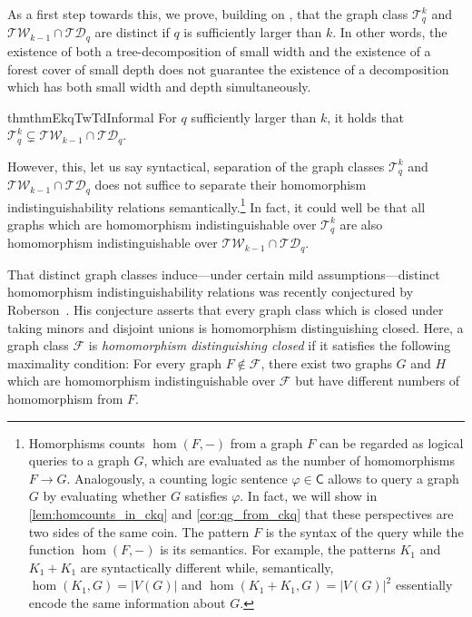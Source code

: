 \documentclass{lmcs}
\theoremstyle{plain}\newtheorem{claim}[thm]{Claim}   %
\newcommand{\cT}{\ensuremath{\mathcal T}}
\newcommand{\TW}{\ensuremath{\mathcal{TW}}}
\newcommand{\TD}{\ensuremath{\mathcal{TD}}}
\newcommand{\Ekq}{\ensuremath{\cT_{q}^{k}}}
\renewcommand\phi\varphi
\begin{document}
As a first step towards this, we prove, building on \cite{Furer_rounds_2001}, that the graph class $\Ekq$ and $ \TW_{k-1}\cap\TD_q$ are distinct if $q$ is sufficiently larger than $k$.
In other words, the existence of both a tree-decomposition of small width and the existence of a forest cover of small depth does not guarantee the existence of a decomposition which has both small width and depth simultaneously.

\begin{restatable}{thm}{thmEkqTwTdInformal}
	\label{thm:Ekq_tw-td-informal}
	For $q$ sufficiently larger than $k$, it holds that $\Ekq\subsetneq \TW_{k-1}\cap\TD_q$.
\end{restatable}

However, this, let us say syntactical, separation of the graph classes $\Ekq$ and $\mathcal{TW}_{k-1} \cap \mathcal{TD}_q$ does not suffice to separate their homomorphism indistinguishability relations semantically.\footnote{Homorphisms counts $\hom(F, -)$ from a graph $F$ can be regarded as logical queries to a graph $G$, which are evaluated as the number of homomorphisms $F \to G$. Analogously, a counting logic sentence $\phi \in \mathsf{C}$ allows to query a graph $G$ by evaluating whether $G$ satisfies $\phi$. In fact, we will show in \autoref{lem:homcounts_in_ckq} and \autoref{cor:qg_from_ckq} that these perspectives are two sides of the same coin.
	The pattern $F$ is the syntax of the query while the function $\hom(F, -)$ is its semantics. For example, the patterns $K_1$ and $K_1 + K_1$ are syntactically different while, semantically, $\hom(K_1, G) = |V(G)|$ and $\hom(K_1 + K_1, G) = |V(G)|^2$ essentially encode the same information about $G$.}
In fact, it could well be that all graphs which are homomorphism indistinguishable over $\Ekq$ are also homomorphism indistinguishable over $\mathcal{TW}_{k-1} \cap \mathcal{TD}_q$.

That distinct graph classes induce---under certain mild assumptions---distinct homomorphism indistinguishability relations was recently conjectured by Roberson~\cite{roberson_oddomorphisms_2022}. 
His conjecture asserts that every graph class which is closed under taking minors and disjoint unions is homomorphism distinguishing closed. Here, a graph class $\mathcal{F}$ is \emph{homomorphism distinguishing closed} if it satisfies the following maximality condition: For every graph $F \not\in \mathcal{F}$, there exist two graphs $G$ and $H$ which are homomorphism indistinguishable over $\mathcal{F}$ but have different numbers of homomorphism from $F$.
\end{document}
